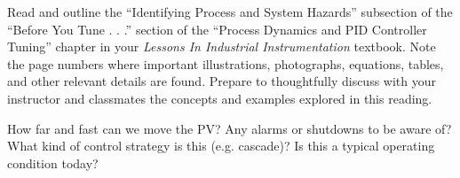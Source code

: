 

Read and outline the ``Identifying Process and System Hazards'' subsection of the ``Before You Tune . . .'' section of the ``Process Dynamics and PID Controller Tuning'' chapter in your {\it Lessons In Industrial Instrumentation} textbook.  Note the page numbers where important illustrations, photographs, equations, tables, and other relevant details are found.  Prepare to thoughtfully discuss with your instructor and classmates the concepts and examples explored in this reading.














How far and fast can we move the PV?  Any alarms or shutdowns to be aware of?  What kind of control strategy is this (e.g. cascade)?  Is this a typical operating condition today?




